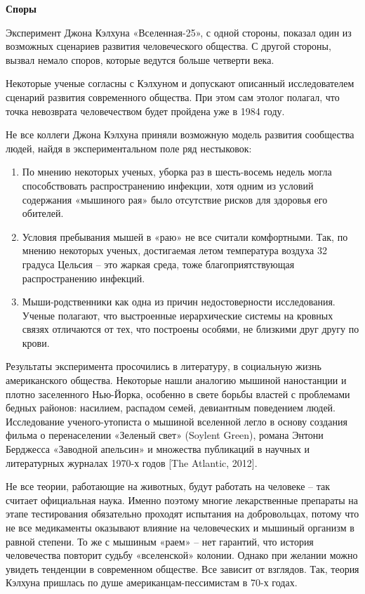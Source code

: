 \textbf{Споры}

Эксперимент Джона Кэлхуна «Вселенная-25», с одной стороны, показал один из возможных сценариев развития человеческого общества. С другой стороны, вызвал немало споров, которые ведутся больше четверти века.

Некоторые ученые согласны с Кэлхуном и допускают описанный исследователем сценарий развития современного общества. При этом сам этолог полагал, что точка невозврата человечеством будет пройдена уже в 1984 году.

Не все коллеги Джона Кэлхуна приняли возможную модель развития сообщества людей, найдя в экспериментальном поле ряд нестыковок:


\begin{enumerate}
    \item По мнению некоторых ученых, уборка раз в шесть-восемь недель могла способствовать распространению инфекции, хотя одним из условий содержания «мышиного рая» было отсутствие рисков для здоровья его обителей.
    \item Условия пребывания мышей в «раю» не все считали комфортными. Так, по мнению некоторых ученых, достигаемая летом температура воздуха 32 градуса Цельсия – это жаркая среда, тоже благоприятствующая распространению инфекций.
    \item Мыши-родственники как одна из причин недостоверности исследования. Ученые полагают, что выстроенные иерархические системы на кровных связях отличаются от тех, что построены особями, не близкими друг другу по крови.
\end{enumerate}

Результаты эксперимента просочились в литературу, в социальную жизнь американского общества. Некоторые нашли аналогию мышиной наностанции и плотно заселенного Нью-Йорка, особенно в свете борьбы властей с проблемами бедных районов: насилием, распадом семей, девиантным поведением людей. Исследование ученого-утописта о мышиной вселенной легло в основу создания фильма о перенаселении «Зеленый свет» (Soylent Green), романа Энтони Берджесса «Заводной апельсин» и множества публикаций в научных и литературных журналах 1970-х годов [The Atlantic, 2012].

Не все теории, работающие на животных, будут работать на человеке – так считает официальная наука. Именно поэтому многие лекарственные препараты на этапе тестирования обязательно проходят испытания на добровольцах, потому что не все медикаменты оказывают влияние на человеческих и мышиный организм в равной степени. То же с мышиным «раем» – нет гарантий, что история человечества повторит судьбу «вселенской» колонии. Однако при желании можно увидеть тенденции в современном обществе. Все зависит от взглядов. Так, теория Кэлхуна пришлась по душе американцам-пессимистам в 70-х годах.

